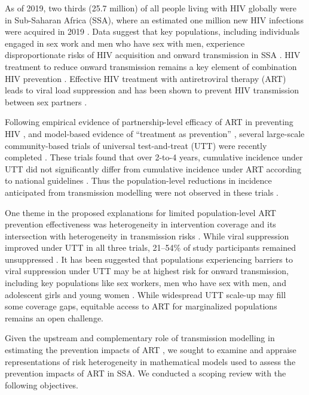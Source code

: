 As of 2019, two thirds (25.7 million) of all people living with HIV globally
were in Sub-Saharan Africa (SSA), where
an estimated one million new HIV infections were acquired in 2019 \cite{AIDSinfo}.
Data suggest that key populations, including individuals engaged in sex work and men who have sex with men,
experience disproportionate risks of HIV acquisition and onward transmission in SSA
\cite{Baral2012,Beyrer2012,Mishra2012,Boily2015}.
HIV treatment to reduce onward transmission remains a key element of combination HIV prevention \cite{WHO2016ART}.
Effective HIV treatment with antiretroviral therapy (ART) leads to viral load suppression
and has been shown to prevent HIV transmission between sex partners \cite{Lundgren2015,Danel2015,Cohen2016}.
\par
Following empirical evidence of partnership-level efficacy of ART
in preventing HIV \cite{Lundgren2015,Danel2015,Cohen2016},
and model-based evidence of ``treatment as prevention'' \cite{Granich2009,Eaton2012,Cori2014},
several large-scale community-based trials of universal test-and-treat (UTT)
were recently completed \cite{Iwuji2018,Havlir2019,Hayes2019}.
These trials found that over 2-to-4 years,
cumulative incidence under UTT did not significantly differ from
cumulative incidence under ART according to national guidelines \cite{Havlir2019,Hayes2019,Iwuji2018}.
Thus the population-level reductions in incidence anticipated from transmission modelling
were not observed in these trials \cite{Baral2019,Havlir2020}.
\par
One theme in the proposed explanations for limited population-level ART prevention effectiveness
was heterogeneity in intervention coverage and its intersection with
heterogeneity in transmission risks \cite{AbdoolKarim2019,Baral2019}.
While viral suppression improved under UTT in all three trials,
21--54\% of study participants remained unsuppressed \cite{Iwuji2018,Havlir2019,Hayes2019}.
It has been suggested that populations experiencing barriers to viral suppression under UTT
may be at highest risk for onward transmission, including key populations like
sex workers, men who have sex with men, and adolescent girls and young women
\cite{Hakim2018,Nyato2019,Green2020}.
While widespread UTT scale-up may fill some coverage gaps,
equitable access to ART for marginalized populations remains an open challenge.
\par
Given the upstream and complementary role of transmission modelling
in estimating the prevention impacts of ART \cite{Eaton2012,Delva2012},
we sought to examine and appraise representations of risk heterogeneity
in mathematical models used to assess the prevention impacts of ART in SSA.
We conducted a scoping review with the following objectives.
